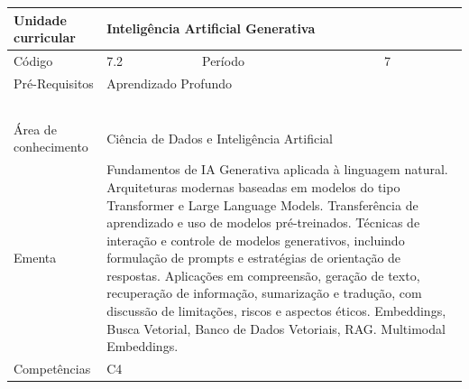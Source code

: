 \clearpage
\newpage

\begin{quadro}[ht!]
  \centering\scriptsize
\caption{Unidade Curricular Inteligência Artificial Generativa}

\begin{tabular}{|p{2.5cm}|p{2.5cm}|p{2.5cm}|p{2.5cm}|p{2.5cm}|}\hline

  Unidade curricular & \multicolumn{4}{p{10cm}|}{ Inteligência Artificial Generativa }\\\hline
  Código & 7.2 & Período & \multicolumn{2}{p{5cm}|}{ 7 }\\\hline
  Pré-Requisitos & \multicolumn{4}{p{10cm}|}{ Aprendizado Profundo } \\\hline
  \cellcolor{blue1}{ CH PRESENCIAL } &
    \cellcolor{blue1}{CH EAD Síncrona} &
    \cellcolor{blue1}{CH EAD Síncrona Mediada} &
    \cellcolor{blue1}{CH EAD Assíncrona} &
    \cellcolor{blue1}{CH APCC} \\\hline
  \cellcolor{blue1}{ 0 } &
    \cellcolor{blue1}{ 0 } &
    \cellcolor{blue1}{ 30 } &
    \cellcolor{blue1}{ 30 } &
    \cellcolor{blue1}{0} \\\hline
  \cellcolor{blue1}{ CH Teórica } &
    \cellcolor{blue1}{CH Prática} &
    \cellcolor{blue1}{CH Humanidades} &
    \cellcolor{blue1}{CH Extensão} &
    \cellcolor{blue1}{CH EAD TOTAL} \\\hline
  \cellcolor{blue1}{ 30 } &
    \cellcolor{blue1}{ 30 } &
    \cellcolor{blue1}{ 0 } &
    \cellcolor{blue1}{ 0 } &
    \cellcolor{blue1}{ 60 } \\\hline
  \cellcolor{blue1}{CARGA-HORÁRIA TOTAL} & \multicolumn{4}{p{10cm}|}{ \cellcolor{blue1}{ 60 } } \\\hline
  Área de conhecimento & \multicolumn{4}{p{10cm}|}{ Ciência de Dados e Inteligência Artificial } \\\hline
  Ementa & \multicolumn{4}{p{10cm}|}{ Fundamentos de IA Generativa aplicada à linguagem natural. Arquiteturas modernas baseadas em modelos do tipo Transformer e Large Language Models. Transferência de aprendizado e uso de modelos pré-treinados. Técnicas de interação e controle de modelos generativos, incluindo formulação de prompts e estratégias de orientação de respostas. Aplicações em compreensão, geração de texto, recuperação de informação, sumarização e tradução, com discussão de limitações, riscos e aspectos éticos. Embeddings, Busca Vetorial, Banco de Dados Vetoriais, RAG. Multimodal Embeddings. } \\\hline
  Competências & \multicolumn{4}{p{10cm}|}{ C4 } \\\hline


  
	\end{tabular}

\end{quadro}


